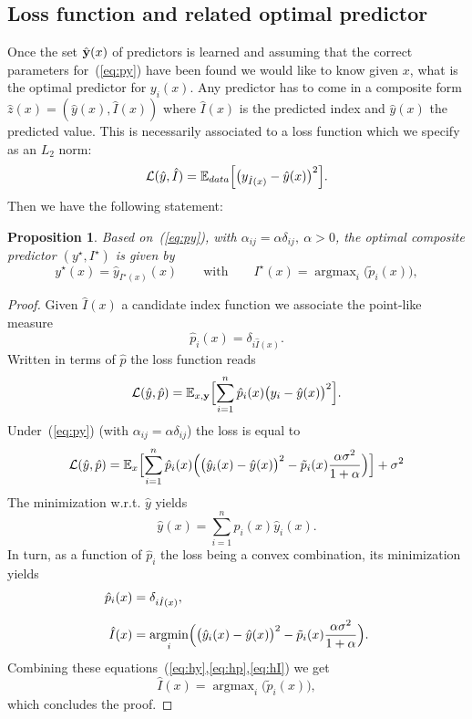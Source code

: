 \documentclass[envcountsect,runningheads]{llncs}
\theoremstyle{etoile}
\newtheorem{prop}{Proposition}[section]
\DeclareMathOperator*{\argmin}{argmin}
\DeclareMathOperator*{\argmax}{argmax}
\begin{document}
\subsection{Loss function and related optimal predictor}
Once the set $\hat {\bf y}(x)$ of predictors is learned and assuming that the correct parameters for~(\ref{eq:py}) have been found
we would like to know given $x$, what is the optimal predictor for $y_i(x)$. Any predictor has  to come in a composite form
$\hat z(x) = (\hat y(x),\hat I(x))$ where $\hat I(x)$ is the predicted index and $\hat y(x)$ the predicted value.
This is necessarily associated to a loss function 
which we specify as an $L_2$ norm:
\[
{\cal L}(\hat y,\hat I) = {\mathbb E}_{data}\Bigl[\bigl(y_{\hat I(x)}-\hat y(x)\bigr)^2\Bigr]. 
\]
Then we have the following statement:
\begin{prop}
Based on~(\ref{eq:py}), with $\alpha_{ij} = \alpha\delta_{ij},\ \alpha>0$, the optimal composite predictor $(y^\star,I^\star)$ is given by
\[
y^\star(x) = \hat y_{I^\star(x)}(x)\qquad\text{with}\qquad I^\star(x) = \argmax_{i} \bigl(\tilde p_i(x)\bigr), 
\]
\end{prop}
\begin{proof}
Given $\hat I(x)$ a candidate index function we associate the point-like measure
\[
\hat p_i(x) = \delta_{i\hat I(x)}.
\]
Written in terms of $\hat p$ the loss function reads
\[
{\cal L}(\hat y,\hat p) = {\mathbb E}_{x,{\bf y}}\Bigl[\sum_{i=1}^n \hat p_i(x)\bigl(y_i-\hat y(x)\bigr)^2\Bigr].
\]
Under~(\ref{eq:py}) (with $\alpha_{ij}=\alpha\delta_{ij}$) the loss is equal to
\[
{\cal L}(\hat y,\hat p) = {\mathbb E}_x\Bigl[\sum_{i=1}^n \hat p_i(x)\Bigl( \bigl(\hat y_i(x)-\hat y(x)\bigr)^2-\tilde p_i(x)\frac{\alpha\sigma^2}{1+\alpha}\Bigr)\Bigr]+\sigma^2
\]
The minimization w.r.t. $\hat y$ yields
\begin{equation}\label{eq:hy}
\hat y(x) = \sum_{i=1}^n \hat p_i(x)\hat y_i(x).
\end{equation}
In turn, as a function of $\hat p_i$ the loss being a  convex combination, its minimization yields
\begin{align}
  \hat p_i(x) &= \delta_{i\hat I(x)},\label{eq:hp}\\[0.2cm]
  \hat I(x) &= \argmin_i\Bigl(\bigl(\hat y_i(x)-\hat y(x)\bigr)^2-\tilde p_i(x)\frac{\alpha\sigma^2}{1+\alpha}\Bigr).\label{eq:hI}
\end{align}
Combining these equations~(\ref{eq:hy},\ref{eq:hp},\ref{eq:hI}) we get
\[
  \hat I(x) = \argmax_i\bigl(\tilde p_i(x)\bigr),
\]
which concludes the proof.  
\end{proof}
\end{document}
